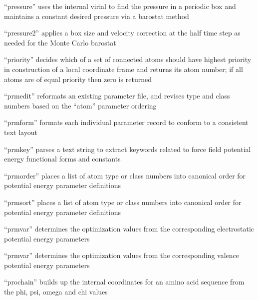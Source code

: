 \documentclass[letterpaper,11pt,english]{sphinxmanual}
\begin{document}

“pressure” uses the internal virial to find the pressure
in a periodic box and maintains a constant desired pressure
via a barostat method


“pressure2” applies a box size and velocity correction at
the half time step as needed for the Monte Carlo barostat


“priority” decides which of a set of connected atoms should
have highest priority in construction of a local coordinate
frame and returns its atom number; if all atoms are of equal
priority then zero is returned


“prmedit” reformats an existing parameter file, and revises
type and class numbers based on the “atom” parameter ordering


“prmform” formats each individual parameter record to conform
to a consistent text layout


“prmkey” parses a text string to extract keywords related to
force field potential energy functional forms and constants


“prmorder” places a list of atom type or class numbers into
canonical order for potential energy parameter definitions


“prmsort” places a list of atom type or class numbers into
canonical order for potential energy parameter definitions


“prmvar” determines the optimization values from the
corresponding electrostatic potential energy parameters


“prmvar” determines the optimization values from the
corresponding valence potential energy parameters


“prochain” builds up the internal coordinates for an amino
acid sequence from the phi, psi, omega and chi values
\end{document}

